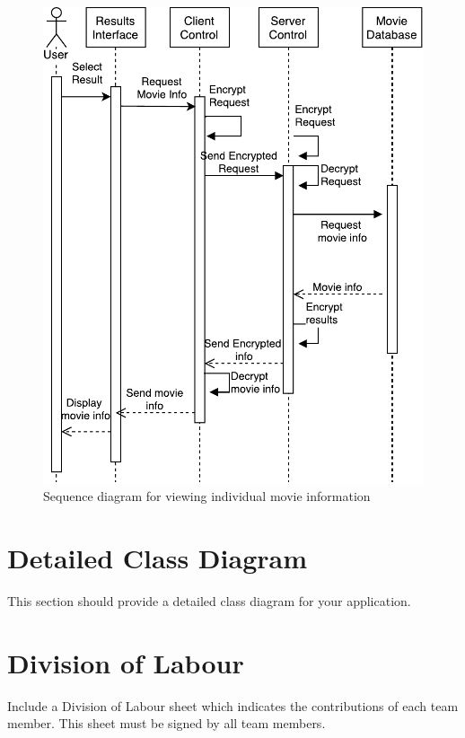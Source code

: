\documentclass[]{article}
\begin{document}
\begin{figure}[H]
	\includegraphics[width=\textwidth]{SD3}
	\centering
	\caption{Sequence diagram for viewing individual movie information}
\end{figure}

\section{Detailed Class Diagram}
\label{sec:detailed_class_diagram}
This section should provide a detailed class diagram for your application.

\appendix
\section{Division of Labour}
\label{sec:division_of_labour}
Include a Division of Labour sheet which indicates the contributions of each team member. This sheet must be signed by all team members.

\newpage
\end{document}
